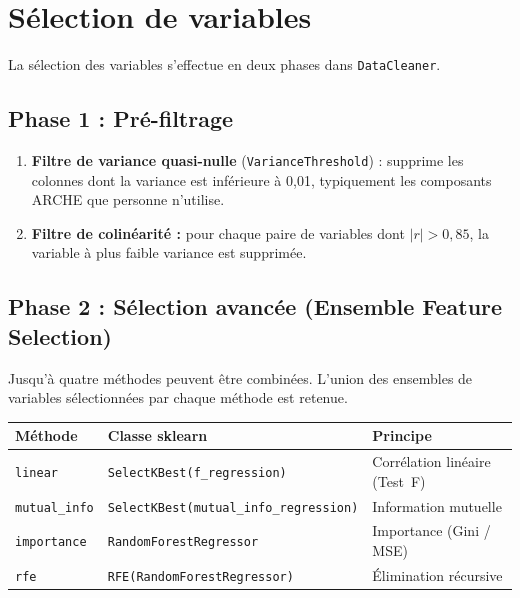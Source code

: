 \documentclass[12pt, a4paper, french]{report}
\begin{document}
\section{Sélection de variables}

La sélection des variables s'effectue en deux phases dans \texttt{DataCleaner}.

\subsection{Phase 1 : Pré-filtrage}

\begin{enumerate}
  \item \textbf{Filtre de variance quasi-nulle} (\texttt{VarianceThreshold}) : supprime les colonnes dont la variance est inférieure à 0,01, typiquement les composants ARCHE que personne n'utilise.

  \item \textbf{Filtre de colinéarité :} pour chaque paire de variables dont $|r| > 0{,}85$, la variable à plus faible variance est supprimée.
\end{enumerate}

\subsection{Phase 2 : Sélection avancée (Ensemble Feature Selection)}

Jusqu'à quatre méthodes peuvent être combinées. L'union des ensembles de variables sélectionnées par chaque méthode est retenue.

\begin{center}
\begin{tabular}{llp{5.5cm}}
\toprule
\textbf{Méthode} & \textbf{Classe sklearn} & \textbf{Principe}\\
\midrule
\texttt{linear}       & \texttt{SelectKBest(f\_regression)}           & Corrélation linéaire (Test~F)\\
\texttt{mutual\_info} & \texttt{SelectKBest(mutual\_info\_regression)} & Information mutuelle\\
\texttt{importance}   & \texttt{RandomForestRegressor}                 & Importance (Gini / MSE)\\
\texttt{rfe}          & \texttt{RFE(RandomForestRegressor)}            & Élimination récursive\\
\bottomrule
\end{tabular}
\end{center}
\end{document}
